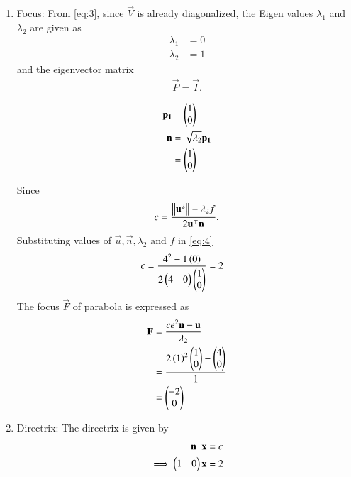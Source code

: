 \documentclass[journal,12pt,twocolumn]{IEEEtran}
\begin{document}
\begin{enumerate}
\begin{enumerate}
\item Focus: From \eqref{eq:3}, since $\vec{V}$ is already diagonalized, the Eigen values $\lambda_1$ and $\lambda_2$ are given as 
\begin{align}
\lambda_1 &= 0 \\
\lambda_2 &= 1 
\end{align}
and the eigenvector matrix
\begin{align}
\vec{P} = \vec{I}.
\end{align}

\begin{align}
\mathbf{p_1} &= \begin{pmatrix}1 \\ 0\end{pmatrix} \\
\mathbf{n} &= \sqrt{\lambda_2}\mathbf{p_1} \\
&= \begin{pmatrix}1 \\ 0\end{pmatrix} 
\end{align}

Since
\begin{align}
\label{eq:4}
c = \frac{\left\lVert\mathbf{u}^2\right\rVert-\lambda_2f}{2\mathbf{u}^\top\mathbf{n}},
\end{align}
Substituting values of $\vec{u}, \vec{n}, \lambda_2 \text{ and } f$ in \eqref{eq:4}
\begin{align}
c &= \frac{4^2-1\left(0\right)}{2 \begin{pmatrix}4 & 0\end{pmatrix}\begin{pmatrix}1 \\ 0\end{pmatrix}} = 2
\end{align}
The focus $\vec{F}$ of parabola is expressed as
\begin{align}
\mathbf{F} &= \frac{ce^2\mathbf{n}-\mathbf{u}}{\lambda_2} \\
&= \frac{2\left(1\right)^2\begin{pmatrix}1 \\0\end{pmatrix} - \begin{pmatrix}4 \\ 0\end{pmatrix}}{1} \\
&= \begin{pmatrix}-2 \\ 0\end{pmatrix}
\end{align}
\item Directrix: The directrix is given by
\begin{align}
\mathbf{n}^\top\mathbf{x} &= c \\
\implies	\begin{pmatrix}1 & 0\end{pmatrix}\mathbf{x} &= 2
\end{align}


\end{enumerate}
\end{enumerate}
\end{document}
